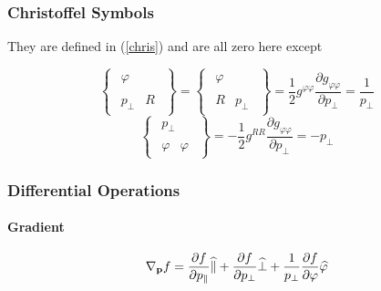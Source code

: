 \subsubsection{Christoffel Symbols}

They are defined in (\ref{chris}) and are all zero here except

\begin{equation*}
\left\{ 
\begin{array}{l}
\begin{array}{ll}
\varphi & \ 
\end{array}
\\ 
\begin{array}{ll}
p_{\bot } & R%
\end{array}%
\end{array}%
\right\} =\left\{ 
\begin{array}{l}
\begin{array}{ll}
\varphi & \ 
\end{array}
\\ 
\begin{array}{ll}
R & p_{\bot }%
\end{array}%
\end{array}%
\right\} =\frac{1}{2}g^{\varphi \varphi }\frac{\partial g_{\varphi \varphi }%
}{\partial p_{\bot }}=\frac{1}{p_{\bot }}
\end{equation*}%
\begin{equation}
\left\{ 
\begin{array}{l}
\begin{array}{ll}
p_{\bot } & \ 
\end{array}
\\ 
\begin{array}{ll}
\varphi & \varphi%
\end{array}%
\end{array}%
\right\} =-\frac{1}{2}g^{RR}\frac{\partial g_{\varphi \varphi }}{\partial
p_{\bot }}=-p_{\bot }
\end{equation}

\subsubsection{Differential Operations}

\paragraph{Gradient}

\begin{equation}
\nabla_{\mathbf{p}}f=\frac{\partial f}{\partial p_{\Vert}}\widehat{\Vert }+%
\frac{\partial f}{\partial p_{\bot}}\widehat{\bot}+\frac{1}{p_{\bot}}\frac{%
\partial f}{\partial\varphi}\widehat{\varphi}  \label{gradparperp}
\end{equation}

